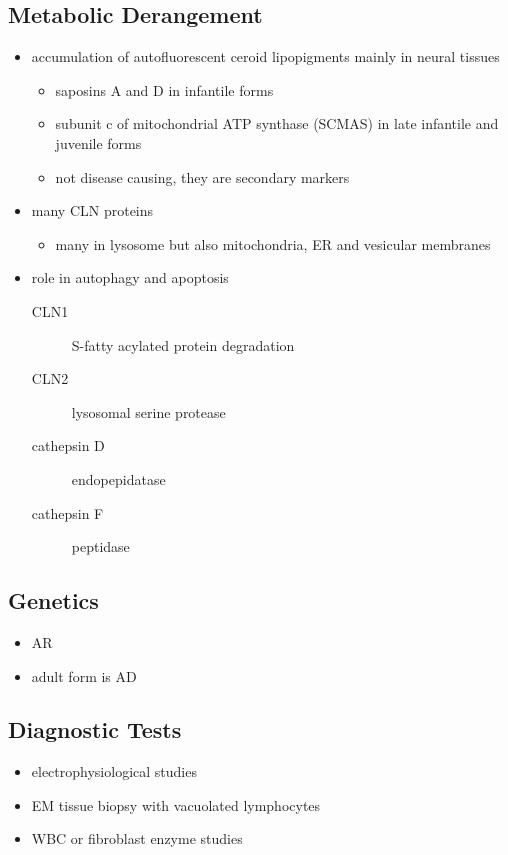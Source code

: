 \documentclass{scrartcl}
\begin{document}
\subsection{Metabolic Derangement}
\label{sec:org8d320ae}
\begin{itemize}
\item accumulation of autofluorescent ceroid lipopigments mainly in
neural tissues
\begin{itemize}
\item saposins A and D in infantile forms
\item subunit c of mitochondrial ATP synthase (SCMAS) in late infantile
and juvenile forms
\item not disease causing, they are secondary markers
\end{itemize}
\item many CLN proteins
\begin{itemize}
\item many in lysosome but also mitochondria, ER and vesicular membranes
\end{itemize}
\item role in autophagy and apoptosis
\begin{description}
\item[{CLN1}] S-fatty acylated protein degradation
\item[{CLN2}] lysosomal serine protease
\item[{cathepsin D}] endopepidatase
\item[{cathepsin F}] peptidase
\end{description}
\end{itemize}

\subsection{Genetics}
\label{sec:orgbfc19b3}
\begin{itemize}
\item AR
\item adult form is AD
\end{itemize}

\subsection{Diagnostic Tests}
\label{sec:org8e84ed5}
\begin{itemize}
\item electrophysiological studies
\item EM tissue biopsy with vacuolated lymphocytes
\item WBC or fibroblast enzyme studies
\end{itemize}
\end{document}
